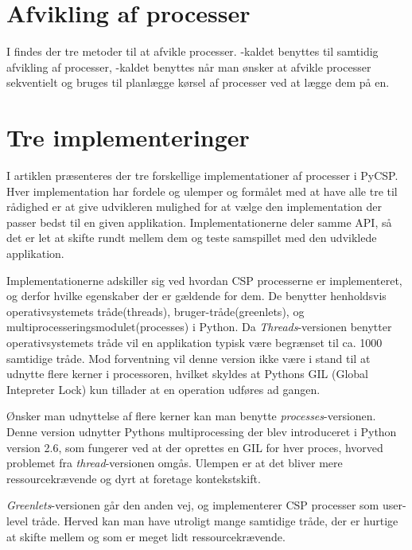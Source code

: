 \section{Afvikling af processer}
I \pycsp findes der tre metoder til at afvikle processer. -kaldet benyttes til samtidig afvikling af processer, -kaldet benyttes når man ønsker at afvikle processer sekventielt og  bruges til planlægge kørsel af processer ved at lægge dem på \sched en. 


\section{Tre implementeringer}
I artiklen \cite{Friborg2009} præsenteres der tre forskellige implementationer af processer i PyCSP. Hver implementation har fordele og ulemper og formålet med at have alle tre til rådighed er at give udvikleren mulighed for at vælge den implementation der passer bedst til en given applikation. Implementationerne deler samme API, så det er let at skifte rundt mellem dem og teste samspillet med den udviklede applikation. 

Implementationerne adskiller sig ved hvordan CSP processerne er implementeret, og derfor hvilke egenskaber der er gældende for dem. De benytter henholdsvis operativsystemets tråde(threads), bruger-tråde(greenlets), og multiprocesseringsmodulet(processes) i Python. Da \emph{Threads}-versionen benytter operativsystemets tråde vil en applikation typisk være begrænset til ca. 1000 samtidige tråde\cite[3]{Friborg2009}. Mod forventning vil denne version ikke være i stand til at udnytte flere kerner i processoren, hvilket skyldes at Pythons GIL (Global Intepreter Lock) kun tillader at en operation udføres ad gangen. 

Ønsker man udnyttelse af flere kerner kan man benytte \emph{processes}-versionen. Denne version udnytter Pythons multiprocessing der blev introduceret i Python version 2.6, som fungerer ved at der oprettes en GIL for hver proces, hvorved problemet fra \emph{thread}-versionen omgås. Ulempen er at det bliver mere ressourcekrævende og dyrt at foretage kontekstskift. 

\emph{Greenlets}-versionen går den anden vej, og implementerer CSP processer som user-level tråde. Herved kan man have utroligt mange samtidige tråde, der er hurtige at skifte mellem og som er meget lidt ressourcekrævende. 

